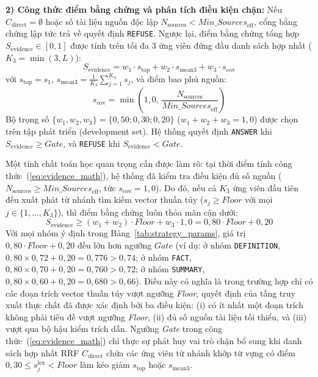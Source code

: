 \documentclass{IEEEtran}
\begin{document}
\textbf{2) Công thức điểm bằng chứng và phân tích điều kiện chặn:}
Nếu $C_{\text{direct}} = \emptyset$ hoặc số tài liệu nguồn độc lập $N_{\text{sources}} < \textit{Min\_Sources}_{\text{eff}}$, cổng bằng chứng lập tức trả về quyết định \texttt{REFUSE}. Ngược lại, điểm bằng chứng tổng hợp $S_{\text{evidence}} \in [0, 1]$ được tính trên tối đa 3 ứng viên đứng đầu danh sách hợp nhất ($K_3 = \min(3, L)$):
\begin{equation}
\label{eq:evidence_math}
S_{\text{evidence}} = w_1 \cdot s_{\text{top}} + w_2 \cdot s_{\text{mean3}} + w_3 \cdot s_{\text{cov}}
\end{equation}
với $s_{\text{top}} = s_1$, $s_{\text{mean3}} = \frac{1}{K_3}\sum_{j=1}^{K_3} s_j$, và điểm bao phủ nguồn:
\begin{equation}
\label{eq:coverage_math}
s_{\text{cov}} = \min \left( 1{,}0, \, \frac{N_{\text{sources}}}{\textit{Min\_Sources}_{\text{eff}}} \right)
\end{equation}
Bộ trọng số $\{w_1, w_2, w_3\} = \{0{,}50; 0{,}30; 0{,}20\}$ ($w_1 + w_2 + w_3 = 1{,}0$) được chọn trên tập phát triển (development set). Hệ thống quyết định \texttt{ANSWER} khi $S_{\text{evidence}} \ge \textit{Gate}$, và \texttt{REFUSE} khi $S_{\text{evidence}} < \textit{Gate}$.

Một tính chất toán học quan trọng cần được làm rõ: tại thời điểm tính công thức~(\ref{eq:evidence_math}), hệ thống đã kiểm tra điều kiện đủ số nguồn ($N_{\text{sources}} \ge \textit{Min\_Sources}_{\text{eff}}$, tức $s_{\text{cov}} = 1{,}0$). Do đó, nếu cả $K_3$ ứng viên đầu tiên đều xuất phát từ nhánh tìm kiếm vector thuần túy ($s_j \ge \textit{Floor}$ với mọi $j \in \{1, \dots, K_3\}$), thì điểm bằng chứng luôn thỏa mãn cận dưới:
\begin{equation}
\label{eq:floor_bound}
S_{\text{evidence}} \ge (w_1 + w_2)\cdot \textit{Floor} + w_3 \cdot 1{,}0 = 0{,}80\cdot \textit{Floor} + 0{,}20
\end{equation}
Với mọi nhóm ý định trong Bảng~\ref{tab:strategy_params}, giá trị $0{,}80\cdot \textit{Floor} + 0{,}20$ đều lớn hơn ngưỡng $\textit{Gate}$ (ví dụ: ở nhóm \texttt{DEFINITION}, $0{,}80 \times 0{,}72 + 0{,}20 = 0{,}776 > 0{,}74$; ở nhóm \texttt{FACT}, $0{,}80 \times 0{,}70 + 0{,}20 = 0{,}760 > 0{,}72$; ở nhóm \texttt{SUMMARY}, $0{,}80 \times 0{,}60 + 0{,}20 = 0{,}680 > 0{,}66$). Điều này có nghĩa là trong trường hợp chỉ có các đoạn trích vector thuần túy vượt ngưỡng \textit{Floor}, quyết định của tầng truy xuất thực chất đã được xác định bởi ba điều kiện: (i) có ít nhất một đoạn trích không phải tiêu đề vượt ngưỡng \textit{Floor}, (ii) đủ số nguồn tài liệu tối thiểu, và (iii) vượt qua bộ hậu kiểm trích dẫn. Ngưỡng \textit{Gate} trong công thức~(\ref{eq:evidence_math}) chỉ thực sự phát huy vai trò chặn bổ sung khi danh sách hợp nhất RRF $C_{\text{direct}}$ chứa các ứng viên từ nhánh khớp từ vựng có điểm $0{,}30 \le s_j^{\text{lex}} < \textit{Floor}$ làm kéo giảm $s_{\text{top}}$ hoặc $s_{\text{mean3}}$.
\end{document}
